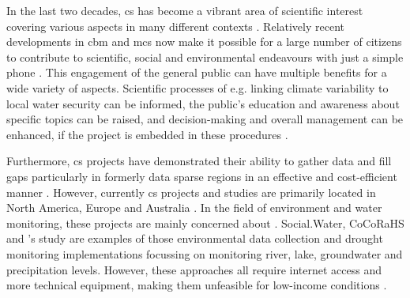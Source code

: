 In the last two decades, \acrlong{cs} has become a vibrant area of scientific interest covering various aspects in many different contexts \autocite{kirschkeCitizenScienceProjects2022,kullenbergWhatCitizenScience2016}. Relatively recent developments in \acrlong{cbm} and \acrlong{mcs} now make it possible for a large number of citizens to contribute to scientific, social and environmental endeavours with just a simple phone \autocite{butteFrameworkWaterSecurity2022}. This engagement of the general public can have multiple benefits for a wide variety of aspects. Scientific processes of e.g. linking climate variability to local water security can be informed, the public's education and awareness about specific topics can be raised, and decision-making and overall management can be enhanced, if the project is embedded in these procedures \autocite{huangManagementDrinkingWater2020,kirschkeCitizenScienceProjects2022,minkmanCitizenScienceWater2015}.


Furthermore, \acrshort{cs} projects have demonstrated their ability to gather data and fill gaps particularly in formerly data sparse regions in an effective and cost-efficient manner \autocite{butteFrameworkWaterSecurity2022,lackstromBackyardHydroclimatologyCitizen2022,weeserCitizenSciencePioneers2018a}. However, currently \acrshort{cs} projects and studies are primarily located in North America, Europe and Australia \autocite{kirschkeCitizenScienceProjects2022, koehlerCitizenParticipationCollaborative2008, livinglakescanadaElevatingCommunityBased2018}. In the field of environment and water monitoring, these projects are mainly concerned about  \autocite{kirschkeCitizenScienceProjects2022}. Social.Water, CoCoRaHS and \autocite{speirSolutionsCurrentChallenges2022}'s study are examples of those environmental data collection and drought monitoring implementations focussing on monitoring river, lake, groundwater and precipitation levels. However, these approaches all require internet access and more technical equipment, making them unfeasible for low-income conditions \autocite{fienenSocialWaterCrowdsourcing2012a,lackstromBackyardHydroclimatologyCitizen2022,lowryGrowingPainsCrowdsourced2019}.\newline











